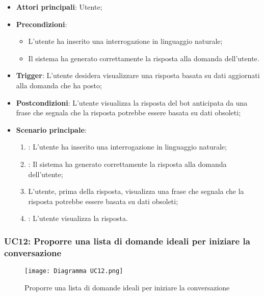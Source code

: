\begin{itemize}
    \item \textbf{Attori principali}: Utente;
    \item \textbf{Precondizioni}: 
    \begin{itemize}
        \item L'utente ha inserito una interrogazione in linguaggio naturale;
        \item Il sistema ha generato correttamente la risposta alla domanda dell'utente.
    \end{itemize}
    \item \textbf{Trigger}: L'utente desidera visualizzare una risposta basata su dati aggiornati alla domanda che ha posto;
    \item \textbf{Postcondizioni}: L'utente visualizza la risposta del bot anticipata da una frase che segnala che la
    risposta potrebbe essere basata su dati obsoleti;
    \item \textbf{Scenario principale}: 
    \begin{enumerate}
        \item {}: L'utente ha inserito una interrogazione in linguaggio naturale;
        \item {}: Il sistema ha generato correttamente la risposta alla domanda dell'utente;
        \item L'utente, prima della risposta, visualizza una frase che segnala che la risposta potrebbe essere basata su dati obsoleti;
        \item {}: L'utente visualizza la risposta.
    \end{enumerate}
\end{itemize}


\newpage
\hypertarget{UC12}{}
\subsubsection{UC12: Proporre una lista di domande ideali per iniziare la conversazione}

\begin{figure}[h]
    \centering
    \texttt{[image: Diagramma UC12.png]}
    \caption{Proporre una lista di domande ideali per iniziare la conversazione}
\end{figure}

